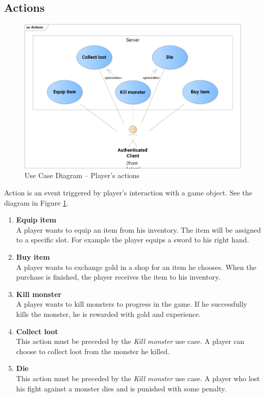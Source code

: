	\subsection{Actions}	
		\begin{figure}[h]	
			\includegraphics[width=\textwidth]{figures/UC_Actions}
			\centering			
			\caption{Use Case Diagram -- Player's actions}
			\label{fig:ucactions}
		\end{figure}
		\noindent Action is an event triggered by player's interaction with a game object. See the diagram in Figure \ref{fig:ucactions}.
		
		\begin{enumerate}
			\item \textbf{Equip item} \\
			A player wants to equip an item from his inventory. The item will be assigned to a specific slot. For example the player equips a sword to his right hand.
			
			\item \textbf{Buy item} \\
			A player wants to exchange gold in a shop for an item he chooses. When the purchase is finished, the player receives the item to his inventory.
			
			\item \textbf{Kill monster} \\
			A player wants to kill monsters to progress in the game. If he successfully kills the monster, he is rewarded with gold and experience.
			
			\item \textbf{Collect loot} \\
			This action must be preceded by the \textit{Kill monster} use case. A player can choose to collect loot from the monster he killed.
			
			\item \textbf{Die} \\
			This action must be preceded by the \textit{Kill monster} use case. A player who lost his fight against a monster dies and is punished with some penalty.		
		\end{enumerate}
	
